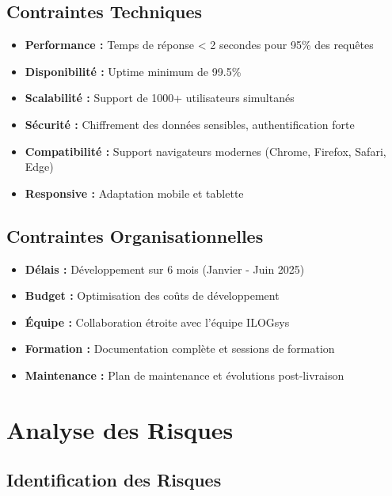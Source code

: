 \documentclass[12pt, a4paper]{report}
\begin{document}
\subsection{Contraintes Techniques}

\begin{itemize}
    \item \textbf{Performance :} Temps de réponse < 2 secondes pour 95\% des requêtes
    \item \textbf{Disponibilité :} Uptime minimum de 99.5\%
    \item \textbf{Scalabilité :} Support de 1000+ utilisateurs simultanés
    \item \textbf{Sécurité :} Chiffrement des données sensibles, authentification forte
    \item \textbf{Compatibilité :} Support navigateurs modernes (Chrome, Firefox, Safari, Edge)
    \item \textbf{Responsive :} Adaptation mobile et tablette
\end{itemize}

\subsection{Contraintes Organisationnelles}

\begin{itemize}
    \item \textbf{Délais :} Développement sur 6 mois (Janvier - Juin 2025)
    \item \textbf{Budget :} Optimisation des coûts de développement
    \item \textbf{Équipe :} Collaboration étroite avec l'équipe ILOGsys
    \item \textbf{Formation :} Documentation complète et sessions de formation
    \item \textbf{Maintenance :} Plan de maintenance et évolutions post-livraison
\end{itemize}

\section{Analyse des Risques}

\subsection{Identification des Risques}
\end{document}
